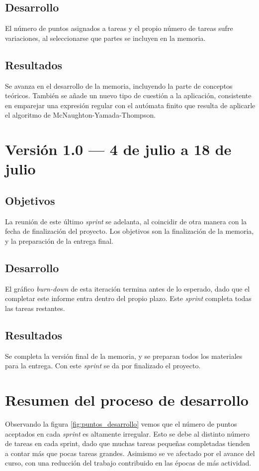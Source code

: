 \subsection{Desarrollo}
El número de puntos asignados a tareas y el propio número de tareas sufre variaciones, al seleccionarse que partes se incluyen en la memoria.


\subsection{Resultados}
Se avanza en el desarrollo de la memoria, incluyendo la parte de conceptos teóricos.
También se añade un nuevo tipo de cuestión a la aplicación, consistente en emparejar una expresión regular con el autómata finito que resulta de aplicarle el algoritmo de McNaughton-Yamada-Thompson.

\section{Versión 1.0 --- 4 de julio a 18 de julio}
\subsection{Objetivos}
La reunión de este último \emph{sprint} se adelanta, al coincidir de otra manera con la fecha de finalización del proyecto.
Los objetivos son la finalización de la memoria, y la preparación de la entrega final.

\subsection{Desarrollo}
El gráfico \emph{burn-down} de esta iteración termina antes de lo esperado, dado que el completar este informe entra dentro del propio plazo.
Este \emph{sprint} completa todas las tareas restantes.


\subsection{Resultados}
Se completa la versión final de la memoria, y se preparan todos los materiales para la entrega.
Con este \emph{sprint} se da por finalizado el proyecto.

\section{Resumen del proceso de desarrollo}
Observando la figura \ref{fig:puntos_desarrollo} vemos que el número de puntos aceptados en cada \emph{sprint} es altamente irregular.
Esto se debe al distinto número de tareas en cada sprint, dado que muchas tareas pequeñas completadas tienden a contar más que pocas tareas grandes.
Asimismo se ve afectado por el avance del curso, con una reducción del trabajo contribuido en las épocas de más actividad.

